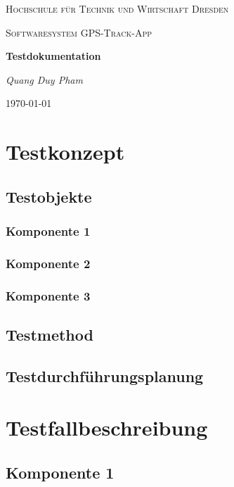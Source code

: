 \documentclass{article}
\begin{document}
\begin{titlepage}
    \centering
    {\scshape\LARGE Hochschule für Technik und Wirtschaft Dresden \par}
    \vspace{1cm}
    {\scshape\Large Softwaresystem \glqq GPS-Track-App\grqq\par}
    \vspace{1.5cm}
    {\huge\bfseries Testdokumentation\par}
    \vspace{2cm}
    {\Large\itshape Quang Duy Pham\par}
    \vfill

    {\large \today\par}
\end{titlepage}
\tableofcontents
\newpage

\section{Testkonzept}
\subsection{Testobjekte}

\subsubsection{Komponente 1}
\subsubsection{Komponente 2}
\subsubsection{Komponente 3}

\subsection{Testmethod}

\subsection{Testdurchführungsplanung}

\section{Testfallbeschreibung}
\subsection{Komponente 1}
\end{document}
